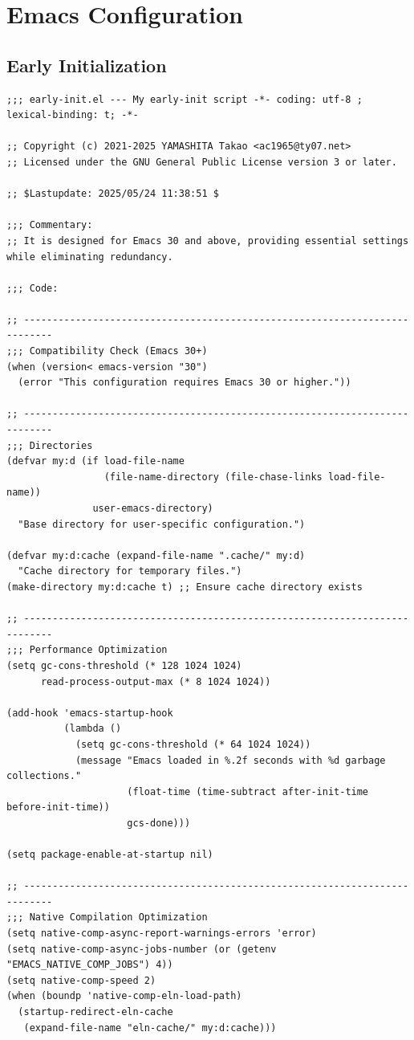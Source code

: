 \documentclass[11pt]{article}
\begin{document}
\section{Emacs Configuration}
\label{sec:org9ec799b}
\subsection{Early Initialization}
\label{sec:orge4ff6a2}

\begin{verbatim}
;;; early-init.el --- My early-init script -*- coding: utf-8 ; lexical-binding: t; -*-

;; Copyright (c) 2021-2025 YAMASHITA Takao <ac1965@ty07.net>
;; Licensed under the GNU General Public License version 3 or later.

;; $Lastupdate: 2025/05/24 11:38:51 $

;;; Commentary:
;; It is designed for Emacs 30 and above, providing essential settings while eliminating redundancy.

;;; Code:

;; ---------------------------------------------------------------------------
;;; Compatibility Check (Emacs 30+)
(when (version< emacs-version "30")
  (error "This configuration requires Emacs 30 or higher."))

;; ---------------------------------------------------------------------------
;;; Directories
(defvar my:d (if load-file-name
                 (file-name-directory (file-chase-links load-file-name))
               user-emacs-directory)
  "Base directory for user-specific configuration.")

(defvar my:d:cache (expand-file-name ".cache/" my:d)
  "Cache directory for temporary files.")
(make-directory my:d:cache t) ;; Ensure cache directory exists

;; ---------------------------------------------------------------------------
;;; Performance Optimization
(setq gc-cons-threshold (* 128 1024 1024)
      read-process-output-max (* 8 1024 1024))

(add-hook 'emacs-startup-hook
          (lambda ()
            (setq gc-cons-threshold (* 64 1024 1024))
            (message "Emacs loaded in %.2f seconds with %d garbage collections."
                     (float-time (time-subtract after-init-time before-init-time))
                     gcs-done)))

(setq package-enable-at-startup nil)

;; ---------------------------------------------------------------------------
;;; Native Compilation Optimization
(setq native-comp-async-report-warnings-errors 'error)
(setq native-comp-async-jobs-number (or (getenv "EMACS_NATIVE_COMP_JOBS") 4))
(setq native-comp-speed 2)
(when (boundp 'native-comp-eln-load-path)
  (startup-redirect-eln-cache
   (expand-file-name "eln-cache/" my:d:cache)))


\end{verbatim}
\end{document}
